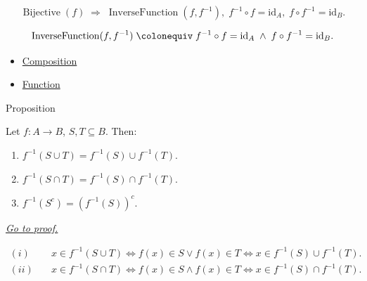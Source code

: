 \begin{remark*}
\[
  \operatorname{Bijective}(f)
  \;\Rightarrow\;
  \operatorname{InverseFunction}(f, f^{-1}),\;
  f^{-1}\circ f=\mathrm{id}_A,\;
  f\circ f^{-1}=\mathrm{id}_B.
\]
\end{remark*}

\begin{remark*}
\[
  \operatorname{InverseFunction}(f, f^{-1})
  \;\colonequiv\;
  f^{-1}\circ f = \mathrm{id}_A \;\wedge\; f\circ f^{-1}=\mathrm{id}_B.
\]
\end{remark*}

\begin{dependencies}
\begin{itemize}
  \item \hyperref[def:composition]{Composition}
  \item \hyperref[def:function]{Function}
\end{itemize}
\end{dependencies}

\begin{propositionbox}{Proposition}
\begin{proposition}
\label{prop:preimage-union-intersection}
Let $f:A\to B$, $S,T\subseteq B$. Then:
\begin{enumerate}[label=(\roman*)]
  \item $f^{-1}(S\cup T)=f^{-1}(S)\cup f^{-1}(T)$.
  \item $f^{-1}(S\cap T)=f^{-1}(S)\cap f^{-1}(T)$.
  \item $f^{-1}(S^c)=(f^{-1}(S))^c$.
\end{enumerate}

\smallskip\noindent
\hyperref[prf:preimage-union-intersection]{\textit{Go to proof.}}
\end{proposition}
\end{propositionbox}

\begin{remark*}
\[
\begin{aligned}
(i)\quad &x\in f^{-1}(S\cup T)\iff f(x)\in S\vee f(x)\in T
         \iff x\in f^{-1}(S)\cup f^{-1}(T). \\
(ii)\quad &x\in f^{-1}(S\cap T)\iff f(x)\in S\wedge f(x)\in T
          \iff x\in f^{-1}(S)\cap f^{-1}(T).
\end{aligned}
\]
\end{remark*}

